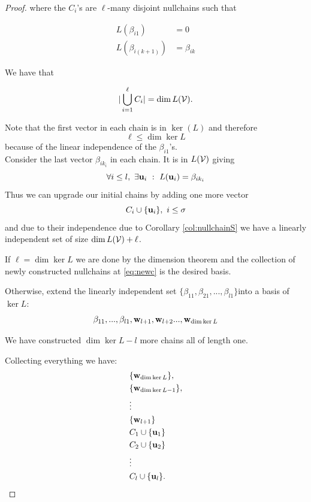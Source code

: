 \begin{proof}
    where the \(C_i\)'s are \(\ell\)-many disjoint nullchains such that

    \begin{align*}
        L(\beta_{i1})     & = 0          \\
        L(\beta_{i(k+1)}) & = \beta_{ik}
    \end{align*}

    We have that

    \begin{equation*}
        |\bigcup_{i=1}^\ell C_i|= \dim L(\mathcal{V}).
    \end{equation*}

    Note that the first vector in each chain is in \( \ker(L)\) and therefore
    \begin{equation}
        \ell \leq \dim\ker L
    \end{equation}
    because of the linear independence of the \(\beta_{i1}\)'s.\\
    Consider the last vector \(\beta_{ik_i}\) in each chain. It is in \(L(\mathcal{V})\)  giving
    \begin{equation}
        \forall i\leq l, \ \exists \mathbf{u}_i\ : \ L(\mathbf{u}_i)=\beta_{ik_i}
    \end{equation}
    Thus we can upgrade our initial chains by adding one more vector
    \begin{equation}
        C_i\cup\{\mathbf{u}_i\} \label{eq:newc}, \ i \leq \sigma
    \end{equation}
    and due to their independence due to Corollary \ref{col:nullchainS} we have a linearly independent set of size \( \dim L(\mathcal{V})+ \ell \).

    If \(\ell=\dim\ker L\) we are done by the dimension theorem and the collection of newly constructed nullchains at \eqref{eq:newc} is the desired basis.

    Otherwise, extend the linearly independent set \(\{\beta_{11}, \beta_{21},...,\beta_{l1}\}\)into a basis of \(\ker L\):
    \begin{equation*}
        {\beta_{11}, ...,\beta_{l1}, \mathbf{w}_{l+1},\mathbf{w}_{l+2}...,\mathbf{w}_{\dim\ker L}}
    \end{equation*}

    We have constructed  \(\dim\ker L-l\) more chains all of length one.

    Collecting everything we have:
    \begin{align*}
            & \{\mathbf{w}_{\dim\ker L}\},   \\
            & \{\mathbf{w}_{\dim\ker L-1}\}, \\
            & \vdots                  \\
            & \{\mathbf{w}_{l+1}\}             \\
            & C_1\cup \{\mathbf{u}_1\}         \\
            & C_2\cup \{\mathbf{u}_2\}         \\
            & \vdots                  \\
            & C_l \cup \{\mathbf{u}_l\}.       \\
    \end{align*}


\end{proof}
